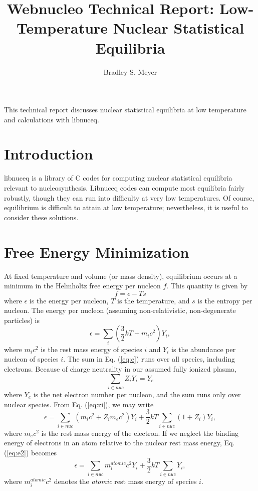 \documentclass{article}    %
\title{Webnucleo Technical Report: Low-Temperature Nuclear Statistical Equilibria}  %
\author{Bradley S. Meyer}
\begin{document}

\maketitle                 %


This technical report discusses nuclear statistical equilibria at low
temperature and calculations with libnuceq.

\section{Introduction}

libnuceq is a library of C codes for computing nuclear statistical
equilibria relevant to nucleosynthesis.  Libnuceq codes can compute most
equilibria fairly robustly, though they can run into difficulty at very low
temperatures.  Of course, equilibrium is difficult to attain at low
temperature; nevertheless, it is useful to consider these solutions.

\section{Free Energy Minimization}

At fixed temperature and volume (or mass density), equilibrium occurs at
a minimum in the Helmholtz free energy per nucleon $f$.  This quantity
is given by
\begin{equation}
f = \epsilon - T s
\label{eq:f}
\end{equation}
where $\epsilon$ is the energy per nucleon, $T$ is the temperature, and
$s$ is the entropy per nucleon.  The energy per nucleon (assuming
non-relativistic, non-degenerate particles) is
\begin{equation}
\epsilon = \sum_i \left(\frac{3}{2}kT + m_ic^2\right)Y_i,
\label{eq:e}
\end{equation}
where $m_ic^2$ is the rest mass energy
of species $i$ and $Y_i$ is the abundance per
nucleon of species $i$.  The sum in Eq. (\ref{eq:e}) runs over all species,
including electrons.  Because of charge neutrality in our assumed
fully ionized plasma,
\begin{equation}
\sum_{i \in nuc} Z_i Y_i = Y_e
\label{eq:zi}
\end{equation}
where $Y_e$ is the net electron number per nucleon, and the sum runs only
over nuclear species.  From Eq. (\ref{eq:zi}), we may write
\begin{equation}
\epsilon = \sum_{i \in nuc} \left(m_ic^2 + Z_im_ec^2\right)Y_i +
\frac{3}{2}kT \sum_{i \in nuc} \left( 1 + Z_i \right ) Y_i,
\label{eq:e2}
\end{equation}
where $m_ec^2$ is the rest mass energy of the electron.  If we neglect the
binding energy of electrons in an atom relative to the nuclear rest mass
energy, Eq. (\ref{eq:e2}) becomes
\begin{equation}
\epsilon = \sum_{i \in nuc} m_i^{atomic}c^2 Y_i + \frac{3}{2}kT
\sum_{i \in nuc} Y_i,
\label{eq:e3}
\end{equation}
where $m_i^{atomic}c^2$ denotes the {\em atomic} rest mass energy of species
$i$.
\end{document}
